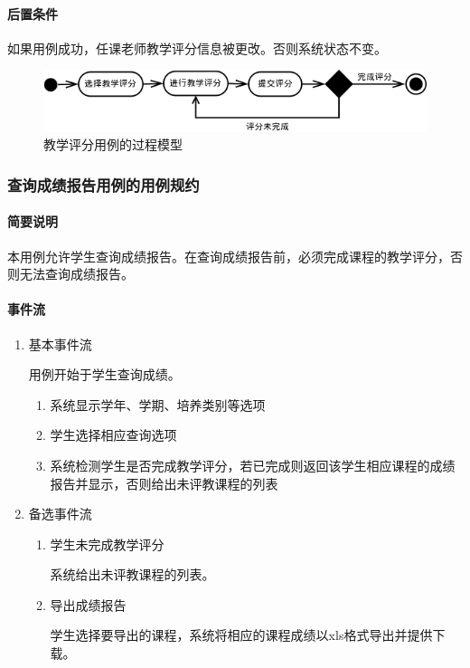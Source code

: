 \paragraph{后置条件}
  
如果用例成功，任课老师教学评分信息被更改。否则系统状态不变。

\begin{figure}[H]
  \centering
  \includegraphics[scale=0.7]{img/jwxt_accessment.png}
  \caption{教学评分用例的过程模型}
\end{figure}

\subsubsection{查询成绩报告用例的用例规约}

\paragraph{简要说明}
  
本用例允许学生查询成绩报告。在查询成绩报告前，必须完成课程的教学评分，否则无法查询成绩报告。
  
\paragraph{事件流}
  
  \begin{enumerate}
    \item 基本事件流
    
    用例开始于学生查询成绩。
    \begin{enumerate}[(1)]
      \item 系统显示学年、学期、培养类别等选项
      \item 学生选择相应查询选项
      \item 系统检测学生是否完成教学评分，若已完成则返回该学生相应课程的成绩报告并显示，否则给出未评教课程的列表
    \end{enumerate}
    
    \item 备选事件流
    \begin{enumerate}[(1)]
      \item 学生未完成教学评分
      
      系统给出未评教课程的列表。
      
      \item 导出成绩报告
      
      学生选择要导出的课程，系统将相应的课程成绩以xls格式导出并提供下载。
      
    \end{enumerate}
  \end{enumerate}
  
